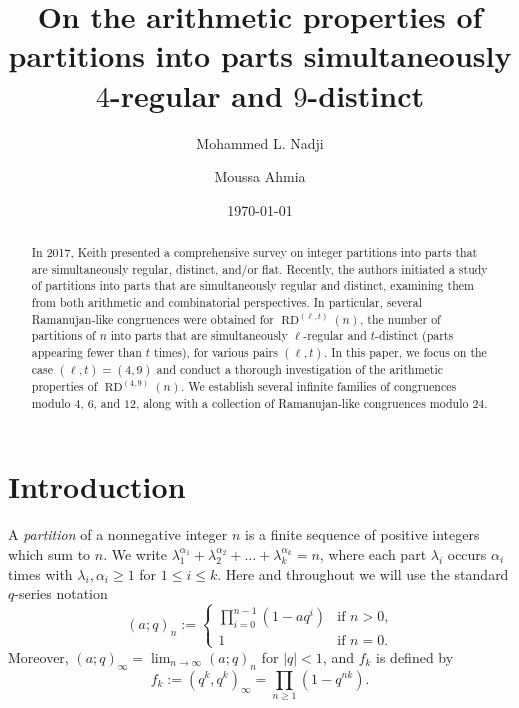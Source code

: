 \documentclass[12pt]{amsart}
\title[]{On the arithmetic properties of partitions into parts simultaneously $4$-regular and $9$-distinct}
\date{\today}
\DeclareMathOperator {\myRD}{RD}
\theoremstyle{plain}
\theoremstyle{definition}
\begin{document}
\author[M. L. Nadji]{Mohammed L. Nadji}
\address{Faculty of Mathematics, University of Science and Technology Houari Boumediene, RECITS laboratory, Algiers. LMAM laboratory, Jijel, 
Algeria}

\author[M. Ahmia]{Moussa Ahmia}
\address{University of Mohamed Seddik Benyahia, LMAM laboratory, Jijel, 
Algeria}








\begin{abstract}
In 2017, Keith presented a comprehensive survey on integer partitions into parts that are simultaneously regular, distinct, and/or flat. Recently, the authors initiated a study of partitions into parts that are simultaneously regular and distinct, examining them from both arithmetic and combinatorial perspectives. In particular, several Ramanujan-like congruences were obtained for $\myRD^{(\ell, t)}(n)$, the number of partitions of $n$ into parts that are simultaneously $\ell$-regular and $t$-distinct (parts appearing fewer than $t$ times), for various pairs $(\ell, t)$. In this paper, we focus on the case $(\ell, t)=(4,9)$ and conduct a thorough investigation of the arithmetic properties of $\myRD^{(4, 9)}(n)$. We establish several infinite families of congruences modulo $4$, $6$, and $12$, along with a collection of Ramanujan-like congruences modulo $24$.
\end{abstract}

\maketitle

\section{Introduction}
A \textit{partition} of a nonnegative integer $n$ is a finite sequence of positive integers which sum to $n$. We write $\lambda_{1}^{\alpha_{1}}+ \lambda_{2}^{\alpha_{2}}+\dots+ \lambda_{k}^{\alpha_{k}}=n$, where each part $\lambda_{i}$ occurs $\alpha_{i}$ times with $\lambda_{i}, \alpha_{i} \geq 1$ for $1 \leq i \leq k$. Here and throughout we will use the standard $q$-series notation
\begin{displaymath}
(a;q)_{n}:=\begin{cases} 
      \prod\limits_{i=0}^{n-1}(1-aq^{i}) &  \text{if $n>0$,} \\
      1 & \text{if $n=0$.}
    \end{cases}
\end{displaymath}
Moreover, $(a;q)_{\infty}=\lim_{n\rightarrow \infty}(a;q)_{n}$ for $|q|<1$, 
and $f_{k}$ is defined by 
\[
f_{k}:=(q^{k},q^{k})_{\infty}=\prod\limits_{n\geq 1}(1-q^{nk}).
\]
\end{document}
